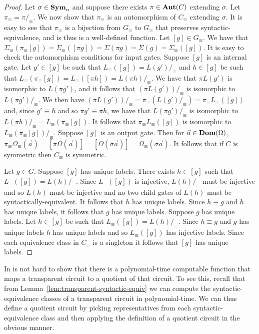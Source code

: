 \documentclass[../main/thesis.tex]{subfiles}
\begin{document}
\begin{proof}
  Let $\sigma \in \text{\textbf{Sym}}_n$ and suppose there exists $\pi \in \text{\textbf{Aut}}(C)$ extending
  $\sigma$. Let $\pi_\equiv = \pi /_\equiv$. We now show that $\pi_\equiv$ is an
  automorphism of $C_\equiv$ extending $\sigma$. It is easy to see that
  $\pi_\equiv$ is a bijection from $G_\equiv$ to $G_\equiv$ that preserves
  syntactic-equivalence, and is thus is a well-defined function. Let $[g] \in
  G_\equiv$. We have that $\Sigma_\equiv (\pi_\equiv [g]) = \Sigma_\equiv ([\pi
  g]) = \Sigma (\pi g) = \Sigma (g) = \Sigma_\equiv ([g])$. It is easy to check
  the automorphism conditions for input gates. Suppose $[g]$ is an internal
  gate. Let $g' \in [g]$ be such that $L_\equiv([g]) = L(g') /_\equiv$ and $h
  \in [g]$ be such that $L_\equiv(\pi_\equiv[g]) = L_\equiv ([\pi h]) = L(\pi h)
  /_\equiv$. We have that $\pi L(g')$ is isomorphic to $L(\pi g')$, and it
  follows that $(\pi L(g'))/_\equiv$ is isomorphic to $L(\pi g') /_\equiv$. We
  then have $(\pi L(g'))/_\equiv = \pi_\equiv (L(g') /_\equiv) = \pi_\equiv
  L_\equiv ([g])$ and, since $g' \equiv h$ and so $\pi g' \equiv \pi h$, we have
  that $L(\pi g')/_\equiv$ is isomorphic to $L(\pi h) /_\equiv =
  L_\equiv(\pi_\equiv[g])$. It follows that $\pi_\equiv L_\equiv ([g])$ is
  isomorphic to $L_\equiv(\pi_\equiv [g]) /_\equiv$. Suppose $[g]$ is an output
  gate. Then for $\vec{a} \in \text{\textbf{Dom}} (\Omega)$, $\pi_\equiv \Omega_\equiv
  (\vec{a}) = [\pi \Omega (\vec{a})] = [\Omega (\sigma \vec{a})] = \Omega_\equiv
  (\sigma \vec{a})$. It follows that if $C$ is symmetric then $C_\equiv$ is
  symmetric.

  Let $g \in G$. Suppose $[g]$ has unique labels. There exists $h \in [g]$ such
  that $L_\equiv([g]) = L(h) /_\equiv$. Since $L_\equiv([g])$ is injective,
  $L(h) /_\equiv$ must be injective and so $L(h)$ must be injective and no two
  child gates of $L(h)$ must be syntactically-equivalent. It follows that $h$
  has unique labels. Since $h \equiv g$ and $h$ has unique labels, it follows
  that $g$ has unique labels. Suppose $g$ has unique labels. Let $h \in [g]$ be
  such that $L_\equiv([g]) = L(h) /_\equiv$. Since $h \equiv g$ and $g$ has
  unique labels $h$ has unique labels and so $L_\equiv([g])$ has injective
  labels. Since each equivalence class in $C_\equiv$ is a singleton it follows
  that $[g]$ has unique labels.
\end{proof}

In is not hard to show that there is a polynomial-time computable function that
maps a transparent circuit to a quotient of that circuit. To see this, recall
that from Lemma~\ref{lem:transparent-syntactic-equiv} we can compute the
syntactic-equivalence classes of a transparent circuit in polynomial-time. We
can thus define a quotient circuit by picking representatives from each
syntactic-equivalence class and then applying the definition of a quotient
circuit in the obvious manner.
\end{document}
